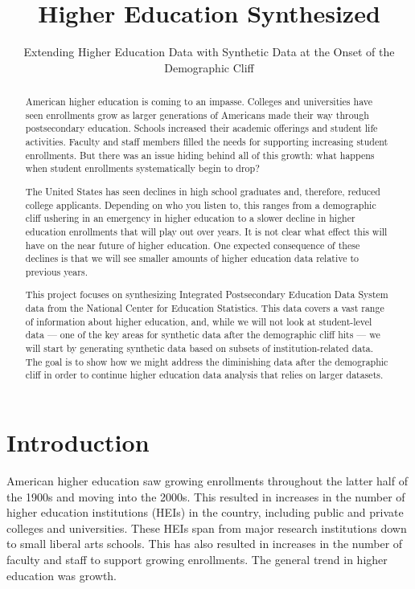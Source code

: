 \documentclass[sigconf, authorversion, nonacm]{acmart}
\begin{document}
\title{Higher Education Synthesized}
\subtitle{Extending Higher Education Data with Synthetic Data at the Onset of the Demographic Cliff}

\begin{abstract}
    American higher education is coming to an impasse. Colleges and universities have seen enrollments grow as larger generations of Americans made their way through postsecondary education. Schools increased their academic offerings and student life activities. Faculty and staff members filled the needs for supporting increasing student enrollments. But there was an issue hiding behind all of this growth: what happens when student enrollments systematically begin to drop?

    The United States has seen declines in high school graduates and, therefore, reduced college applicants. Depending on who you listen to, this ranges from a demographic cliff ushering in an emergency in higher education to a slower decline in higher education enrollments that will play out over years. It is not clear what effect this will have on the near future of higher education. One expected consequence of these declines is that we will see smaller amounts of higher education data relative to previous years.

    This project focuses on synthesizing Integrated Postsecondary Education Data System data from the National Center for Education Statistics. This data covers a vast range of information about higher education, and, while we will not look at student-level data --- one of the key areas for synthetic data after the demographic cliff hits --- we will start by generating synthetic data based on subsets of institution-related data. The goal is to show how we might address the diminishing data after the demographic cliff in order to continue higher education data analysis that relies on larger datasets.
\end{abstract}

\maketitle

\section{Introduction}
    American higher education saw growing enrollments throughout the latter half of the 1900s and moving into the 2000s. This resulted in increases in the number of higher education institutions (HEIs) in the country, including public and private colleges and universities. These HEIs span from major research institutions down to small liberal arts schools. This has also resulted in increases in the number of faculty and staff to support growing enrollments. The general trend in higher education was growth.
\end{document}
